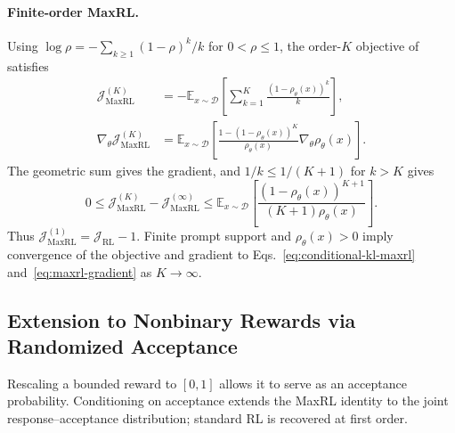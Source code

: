 \paragraph{Finite-order MaxRL.}
Using $\log\rho=-\sum_{k\ge1}(1-\rho)^k/k$ for $0<\rho\le1$, the
order-$K$ objective of \citet{tajwar_maximum_2026} satisfies
\begin{align}
 \mathcal J_{\mathrm{MaxRL}}^{(K)}
 &=-\mathbb E_{x\sim\mathcal D}
       \left[\sum_{k=1}^{K}\frac{(1-\rho_\theta(x))^k}{k}\right],
 \label{eq:app-maxrl-truncation}\\
 \nabla_\theta\mathcal J_{\mathrm{MaxRL}}^{(K)}
 &=\mathbb E_{x\sim\mathcal D}
       \left[\frac{1-(1-\rho_\theta(x))^K}{\rho_\theta(x)}
                         \nabla_\theta\rho_\theta(x)\right].
 \label{eq:app-maxrl-truncated-gradient}
\end{align}
The geometric sum gives the gradient, and $1/k\le1/(K+1)$ for $k>K$ gives
\begin{equation}
 0\le\mathcal J_{\mathrm{MaxRL}}^{(K)}
             -\mathcal J_{\mathrm{MaxRL}}^{(\infty)}
 \le\mathbb E_{x\sim\mathcal D}
       \left[\frac{(1-\rho_\theta(x))^{K+1}}
                    {(K+1)\rho_\theta(x)}\right].
 \label{eq:app-maxrl-truncation-error}
\end{equation}
Thus $\mathcal J_{\mathrm{MaxRL}}^{(1)}=\mathcal J_{\mathrm{RL}}-1$.
Finite prompt support and $\rho_\theta(x)>0$ imply convergence of the
objective and gradient to Eqs.~\eqref{eq:conditional-kl-maxrl}
and~\eqref{eq:maxrl-gradient} as $K\to\infty$.

\subsection{Extension to Nonbinary Rewards via Randomized Acceptance}
\label{app:randomized-reward-extension}

\begin{insight}
Rescaling a bounded reward to $[0,1]$ allows it to serve as an acceptance
probability. Conditioning on acceptance extends the MaxRL identity to
the joint response--acceptance distribution; standard RL is recovered
at first order.
\end{insight}

